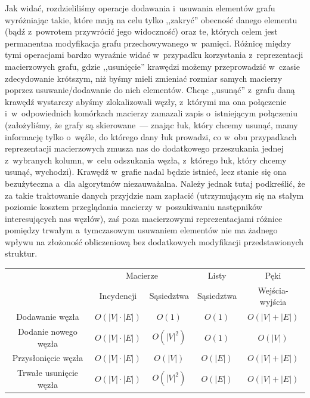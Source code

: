 Jak widać, rozdzieliliśmy operacje dodawania i~usuwania elementów grafu wyróżniając takie, które mają na celu tylko ,,zakryć'' obecność danego elementu (bądź z~powrotem przywrócić jego widoczność) oraz te, których celem jest permanentna modyfikacja grafu przechowywanego w~pamięci.
Różnicę między tymi operacjami bardzo wyraźnie widać w~przypadku korzystania z~reprezentacji macierzowych grafu, gdzie ,,usunięcie'' krawędzi możemy przeprowadzić w~czasie zdecydowanie krótszym, niż byśmy mieli zmieniać rozmiar samych macierzy poprzez usuwanie/dodawanie do nich elementów.
Chcąc ,,usunąć'' z~grafu daną krawędź wystarczy abyśmy zlokalizowali węzły, z~którymi ma ona połączenie i~w~odpowiednich komórkach macierzy zamazali zapis o~istniejącym połączeniu (założyliśmy, że grafy są skierowane~--- znając łuk, który chcemy usunąć, mamy informację tylko o~węźle, do którego dany łuk prowadzi, co w~obu przypadkach reprezentacji macierzowych zmusza nas do dodatkowego przeszukania jednej z~wybranych kolumn, w~celu odszukania węzła, z~którego łuk, który chcemy usunąć, wychodzi).
Krawędź w~grafie nadal będzie istnieć, lecz stanie się ona bezużyteczna a~dla algorytmów niezauważalna.
Należy jednak tutaj podkreślić, że za takie traktowanie danych przyjdzie nam zapłacić (utrzymującym się na stałym poziomie kosztem przeglądania macierzy w~poszukiwaniu następników interesujących nas węzłów), zaś poza macierzowymi reprezentacjami różnice pomiędzy trwałym a~tymczasowym usuwaniem elementów nie ma żadnego wpływu na złożoność obliczeniową bez dodatkowych modyfikacji przedstawionych struktur.

\begin{center}
	\begin{tabular}{ccccc}
		\hline
		& \multicolumn{2}{c}{Macierze} & \multicolumn{1}{c}{Listy} & \multicolumn{1}{c}{Pęki} \\
		& Incydencji & Sąsiedztwa & Sąsiedztwa & Wejścia-wyjścia \\
		\hline
		Dodawanie węzła & $O \left( \left| V \right| \cdot \left| E \right| \right)$ & $O \left( 1 \right)$ & $O \left( 1 \right)$ & $O \left( \left| V \right| + \left| E \right| \right)$ \\
		Dodanie nowego węzła & $O \left( \left| V \right| \cdot \left| E \right| \right)$  & $O \left( \left| V \right| ^{2} \right)$ & $O \left( 1 \right)$ & $O \left( \left| V \right| \right)$ \\
		Przysłonięcie węzła & $O \left( \left| V \right| \cdot \left| E \right| \right)$  & $O \left( \left| V \right| \right)$ & $O \left( \left| E \right| \right)$ & $O \left( \left| V \right| + \left| E \right| \right)$ \\
		Trwałe usunięcie węzła & $O \left( \left| V \right| \cdot \left| E \right| \right)$ & $O \left( \left| V \right| ^{2} \right)$ & $O \left( \left| E \right| \right)$ & $O \left( \left| V \right| + \left| E \right| \right)$ \\
	\end{tabular}
\end{center}

